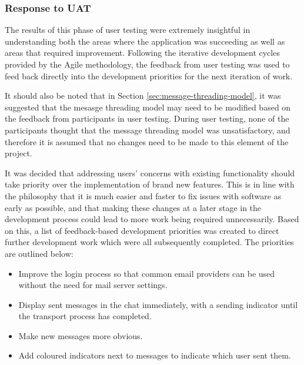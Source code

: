 \subsubsection{Response to UAT}
The results of this phase of user testing were extremely insightful in understanding both the areas where the application was succeeding as well as areas that required improvement. Following the iterative development cycles provided by the Agile methodology, the feedback from user testing was used to feed back directly into the development priorities for the next iteration of work.

It should also be noted that in Section \ref{sec:message-threading-model}, it was suggested that the mesasge threading model may need to be modified based on the feedback from participants in user testing. During user testing, none of the participants thought that the message threading model was unsatisfactory, and therefore it is assumed that no changes need to be made to this element of the project.

It was decided that addressing users' concerns with existing functionality should take priority over the implementation of brand new features. This is in line with the philosophy that it is much easier and faster to fix issues with software as early as possible, and that making these changes at a later stage in the development process could lead to more work being required unnecessarily. Based on this, a list of feedback-based development priorities was created to direct further development work which were all subsequently completed. The priorities are outlined below:

\begin{itemize}
  \item Improve the login process so that common email providers can be used without the need for mail server settings.
  \item Display sent messages in the chat immediately, with a sending indicator until the transport process has completed.
  \item Make new messages more obvious.
  \item Add coloured indicators next to messages to indicate which user sent them.
\end{itemize}